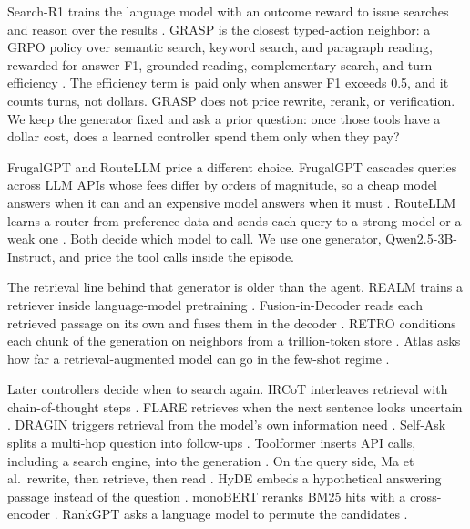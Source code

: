 \documentclass[letterpaper]{article} %
\begin{document}
Search-R1 trains the language model with an outcome reward to issue searches and reason over the results \cite{jin2025searchr1}. GRASP is the closest typed-action neighbor: a GRPO policy over semantic search, keyword search, and paragraph reading, rewarded for answer F1, grounded reading, complementary search, and turn efficiency \cite{gandhi2026grasp}. The efficiency term is paid only when answer F1 exceeds 0.5, and it counts turns, not dollars. GRASP does not price rewrite, rerank, or verification. We keep the generator fixed and ask a prior question: once those tools have a dollar cost, does a learned controller spend them only when they pay?

\mbox{FrugalGPT} and \mbox{RouteLLM} price a different choice. \mbox{FrugalGPT} cascades queries across LLM APIs whose fees differ by orders of magnitude, so a cheap model answers when it can and an expensive model answers when it must \cite{chen2023frugalgpt}. \mbox{RouteLLM} learns a router from preference data and sends each query to a strong model or a weak one \cite{ong2024routellm}. Both decide which model to call. We use one generator, Qwen2.5-3B-Instruct, and price the tool calls inside the episode.

The retrieval line behind that \mbox{generator} is older than the agent. REALM trains a retriever inside language-model pretraining \cite{guu2020realm}. Fusion-in-Decoder reads each retrieved passage on its own and fuses them in the decoder \cite{izacard2021fid}. RETRO conditions each chunk of the generation on neighbors from a trillion-token store \cite{borgeaud2022retro}. Atlas asks how far a retrieval-augmented model can go in the few-shot regime \cite{izacard2023atlas}.

Later controllers decide when to search again. IRCoT interleaves retrieval with chain-of-thought steps \cite{trivedi2023ircot}. FLARE retrieves when the next sentence looks uncertain \cite{jiang2023flare}. DRAGIN triggers retrieval from the model's own information need \cite{su2024dragin}. Self-Ask splits a multi-hop question into follow-ups \cite{press2023selfask}. Toolformer inserts API calls, including a search engine, into the generation \cite{schick2023toolformer}. On the query side, Ma et al.\ rewrite, then retrieve, then read \cite{ma2023rewrite}. HyDE embeds a hypothetical answering passage instead of the question \cite{gao2023hyde}. monoBERT reranks BM25 hits with a cross-encoder \cite{nogueira2019monobert}. RankGPT asks a language model to permute the candidates \cite{sun2023rankgpt}.
\end{document}
